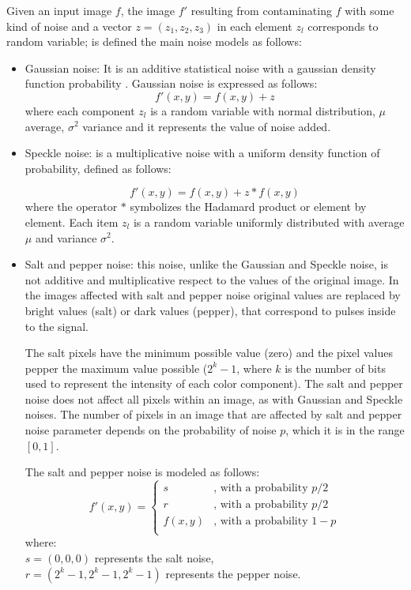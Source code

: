 Given an input image $f$, the image $f'$ resulting from contaminating $f$ with some kind of noise and a vector $z = (z_1, z_2, z_3)$ in each element $z_l$  
corresponds to random variable; is defined the main noise models as follows:

\begin{itemize}
	
\item{Gaussian noise:}
It is an additive  statistical noise with a gaussian density function probability  \cite{davenport1958random}. Gaussian noise is expressed as follows:
\begin{equation}
\label{eq:gaussian_noise}
f'(x, y) = f(x, y) + z
\end{equation}
where each component $z_l$ is a random variable with normal distribution, $\mu$ average, $\sigma^2$ variance and it represents the value of noise added.

\item{Speckle noise:}
is a multiplicative noise with a uniform density function of probability, defined as follows: 

\begin{equation}
\label{eq:speckle}
f'(x, y) = f(x, y) + z \ast f(x, y)  
\end{equation}
where the operator $\ast$ symbolizes the Hadamard product or element by element. Each item $z_l$ is a random variable uniformly distributed with average $\mu$ and variance $\sigma^2$.

\item{Salt and pepper noise:}
this noise, unlike the Gaussian and Speckle noise, is not additive and multiplicative respect to the values of the original image. In the images affected with salt and pepper noise original values are replaced by bright values (salt) or dark values (pepper), that correspond to pulses inside to the signal. 

The salt pixels have the minimum possible value (zero)  and the pixel values pepper the maximum value possible ($2^k - 1$, where $k$ is the number of bits used to represent the intensity of each color component). The salt and pepper noise does not affect all pixels within an image, as with Gaussian and Speckle noises. The number of pixels in an image that are affected by salt and pepper noise parameter depends on the probability of noise $p$, which it is in the range $[0, 1]$.

The salt and pepper noise is modeled as follows:
\begin{equation}
\label{eq:salt_and_pepper}
f'(x, y)=\left\{ \begin{array}{cl}
s & \text{, with a probability } p/2 \\
r & \text{, with a probability } p/2 \\
f(x, y) & \text{, with a probability } 1 - p \\
\end{array}\right.
\end{equation}
where:\\ $s = (0, 0, 0)$ represents the salt noise,\\ $r = (2^k - 1, 2^k - 1, 2^k - 1 )$ represents the pepper noise.


\end{itemize}
